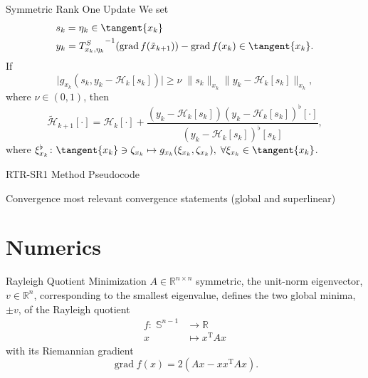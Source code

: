 \documentclass{beamer}
\begin{document}
\begin{frame}{Symmetric Rank One Update}
    We set
    \begin{align*}
        & s_k = \eta_k \in \tangent{x_k} \\
        & y_k = {T^{S}_{x_k, \eta_k}}^{-1} ( \operatorname{grad}f(\tilde{x}_{k+1}) ) - \operatorname{grad}f(x_k) \in \tangent{x_k}.
    \end{align*}
    If 
    \begin{equation*}
        \lvert g_{x_k}(s_k, y_k - \mathcal{H}_k[s_k]) \rvert \geq \nu \; \lVert s_k \rVert_{x_k} \lVert y_k - \mathcal{H}_k[s_k] \rVert_{x_k},
    \end{equation*}
    where $\nu \in (0,1)$, then
    \begin{equation*}
        \tilde{\mathcal{H}}_{k+1} [\cdot] = \mathcal{H}_k [\cdot] + \frac{(y_k - \mathcal{H}_k [s_k]) (y_k - \mathcal{H}_k [s_k])^{\flat} [\cdot] }{(y_k - \mathcal{H}_k [s_k])^{\flat} [s_k]},
    \end{equation*}
    where $\xi^{\flat}_{x_k} \colon \tangent{x_k} \ni \zeta_{x_k} \mapsto g_{x_k}(\xi_{x_k}, \zeta_{x_k}), \; \forall \xi_{x_k} \in \tangent{x_k}$.
\end{frame}

\begin{frame}{RTR-SR1 Method}
    Pseudocode
\end{frame}

\begin{frame}{Convergence}
    most relevant convergence statements (global and superlinear)
\end{frame}


\section{Numerics}

\begin{frame}{Rayleigh Quotient Minimization}
    $A \in \mathbb{R}^{n \times n}$ symmetric, the unit-norm eigenvector, $v \in \mathbb{R}^n$, corresponding to the smallest eigenvalue, defines the two global minima, $\pm v$, of the Rayleigh quotient  
    \begin{equation*}
        \begin{split}
            f \colon \; \mathbb{S}^{n-1} & \to \mathbb{R} \\
            x & \mapsto x^{\mathrm{T}} A x 
        \end{split}
    \end{equation*}   
    with its Riemannian gradient \\[.3\baselineskip]
    \begin{equation*}
        \operatorname{grad} f(x) = 2(Ax - x x^{\mathrm{T}} A x).
    \end{equation*}
\end{frame}
\end{document}
